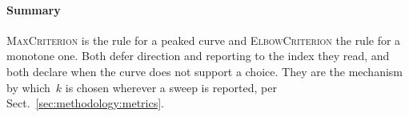 \paragraph{Summary}
\label{sec:measure:relative:summary}
\textsc{MaxCriterion} is the rule for a peaked curve and
\textsc{ElbowCriterion} the rule for a monotone one. Both defer direction
and reporting to the index they read, and both declare when the curve does
not support a choice. They are the mechanism by which~$k$ is chosen
wherever a sweep is reported, per Sect.~\ref{sec:methodology:metrics}.

%
%
